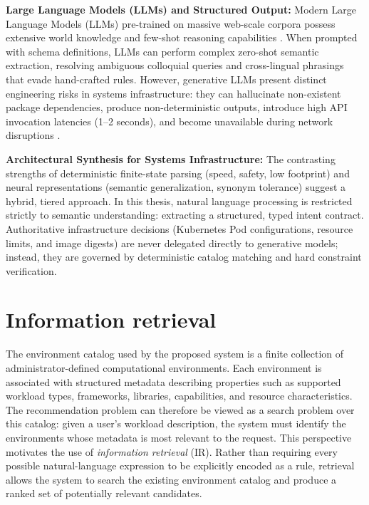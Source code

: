 \textbf{Large Language Models (LLMs) and Structured Output:} Modern Large Language Models (LLMs) pre-trained on massive web-scale corpora possess extensive world knowledge and few-shot reasoning capabilities \cite{brown2020gpt3}. When prompted with schema definitions, LLMs can perform complex zero-shot semantic extraction, resolving ambiguous colloquial queries and cross-lingual phrasings that evade hand-crafted rules. However, generative LLMs present distinct engineering risks in systems infrastructure: they can hallucinate non-existent package dependencies, produce non-deterministic outputs, introduce high API invocation latencies (1--2 seconds), and become unavailable during network disruptions \cite{ji2023hallucination,greshake2023prompt,dziri2023transformers}.

\textbf{Architectural Synthesis for Systems Infrastructure:} The contrasting strengths of deterministic finite-state parsing (speed, safety, low footprint) and neural representations (semantic generalization, synonym tolerance) suggest a hybrid, tiered approach. In this thesis, natural language processing is restricted strictly to semantic understanding: extracting a structured, typed intent contract. Authoritative infrastructure decisions (Kubernetes Pod configurations, resource limits, and image digests) are never delegated directly to generative models; instead, they are governed by deterministic catalog matching and hard constraint verification.

\section{Information retrieval}\label{sec:ir_background}

The environment catalog used by the proposed system is a finite collection of administrator-defined computational environments. Each environment is associated with structured metadata describing properties such as supported workload types, frameworks, libraries, capabilities, and resource characteristics. The recommendation problem can therefore be viewed as a search problem over this catalog: given a user's workload description, the system must identify the environments whose metadata is most relevant to the request. This perspective motivates the use of \emph{information retrieval} (IR). Rather than requiring every possible natural-language expression to be explicitly encoded as a rule, retrieval allows the system to search the existing environment catalog and produce a ranked set of potentially relevant candidates.


